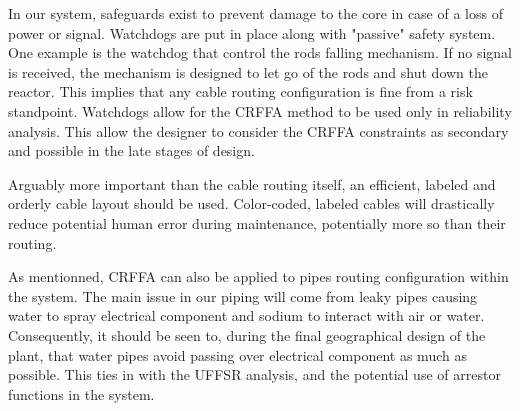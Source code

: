 In our system, safeguards exist to prevent damage to the core in case of a loss of power or signal. Watchdogs are put in place along with "passive" safety system. One example is the watchdog that control the rods falling mechanism. If no signal is received, the mechanism is designed to let go of the rods and shut down the reactor. This implies that any cable routing configuration is fine from a risk standpoint. Watchdogs allow for the CRFFA method to be used only in reliability analysis. This allow the designer to consider the CRFFA constraints as secondary and possible in the late stages of design.


Arguably more important than the cable routing itself, an efficient, labeled and orderly cable layout should be used. Color-coded, labeled cables will drastically reduce potential human error during maintenance, potentially more so than their routing.

As mentionned, CRFFA can also be applied to pipes routing configuration within the system. The main issue in our piping will come from leaky pipes causing water to spray electrical component and sodium to interact with air or water. Consequently, it should be seen to, during the final geographical design of the plant, that water pipes avoid passing over electrical component as much as possible. This ties in with the UFFSR analysis, and the potential use of arrestor functions in the system.

